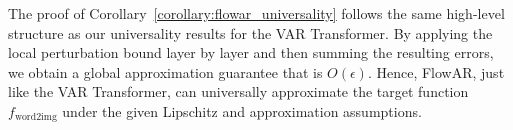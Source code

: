 The proof of Corollary~\ref{corollary:flowar_universality} follows the same high-level structure as our universality results for the VAR Transformer. By applying the local perturbation bound layer by layer and then summing the resulting errors, we obtain a global approximation guarantee that is $O(\epsilon)$. Hence, FlowAR, just like the VAR Transformer, can universally approximate the target function $f_{\mathrm{word2img}}$ under the given Lipschitz and approximation assumptions.